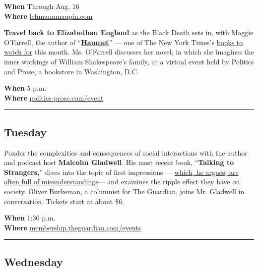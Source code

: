 \textbf{When} Through Aug. 16\\
\textbf{Where}
\href{https://www.lehmannmaupin.com/viewing-room/tony-oursler}{lehmannmaupin.com}

\textbf{Travel back to Elizabethan England} as the Black Death sets in,
with Maggie O'Farrell, the author of
``\textbf{\href{https://www.nytimes.com/2020/07/17/books/review/hamnet-maggie-ofarrell.html}{Hamnet}}''
--- one of The New York Times's
\href{https://www.nytimes.com/2020/06/24/books/new-july-books.html}{books
to watch for} this month. Ms. O'Farrell discusses her novel, in which
she imagines the inner workings of William Shakespeare's family, at a
virtual event held by Politics and Prose, a bookstore in Washington,
D.C.

\textbf{When} 5 p.m.\\
\textbf{Where}
\href{https://www.politics-prose.com/event/book/pp-live-maggie-ofarrell-hamnet-in-conversation-amity-gaige}{politics-prose.com/event}

\begin{center}\rule{0.5\linewidth}{\linethickness}\end{center}

\hypertarget{tuesday}{%
\subsection{Tuesday}\label{tuesday}}

Ponder the complexities and consequences of social interactions with the
author and podcast host \textbf{Malcolm Gladwell}. His most recent book,
``\textbf{Talking to Strangers,}'' dives into the topic of first
impressions ---
\href{https://www.nytimes.com/2019/08/30/business/malcolm-gladwell-talking-to-strangers.html}{which,
he argues, are often full of misunderstandings}--- and examines the
ripple effect they have on society. Oliver Burkeman, a columnist for The
Guardian, joins Mr. Gladwell in conversation. Tickets start at about
\$6.

\textbf{When} 1:30 p.m.\\
\textbf{Where}
\href{https://membership.theguardian.com/events}{membership.theguardian.com/events}

\begin{center}\rule{0.5\linewidth}{\linethickness}\end{center}

\hypertarget{wednesday}{%
\subsection{Wednesday}\label{wednesday}}

